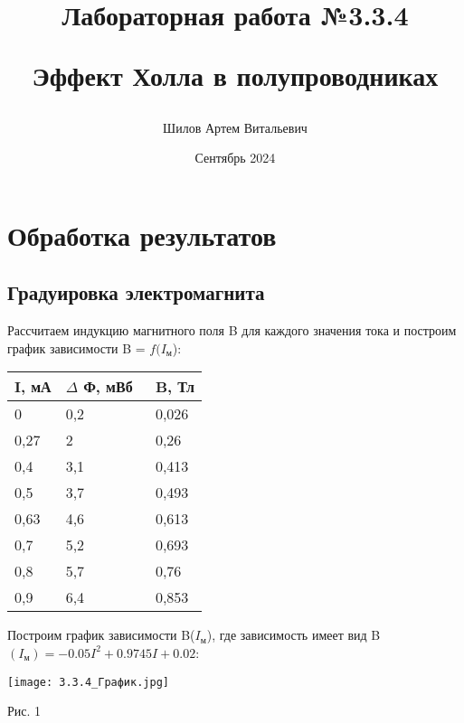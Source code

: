 \documentclass[a4paper, 12pt]{article}
\title{\begin{center}Лабораторная работа №3.3.4\end{center}
Эффект Холла в полупроводниках}
\author{Шилов Артем Витальевич\\}
\date{Сентябрь 2024}
\begin{document}
    \maketitle
    

\section{Обработка результатов}
\subsection{Градуировка электромагнита}
Рассчитаем индукцию магнитного поля B для каждого значения тока и построим график зависимости B = $f(I_\text{м}$):
\begin{center}
\begin{tabular}{|l|l|l|}
\hline
I, мА & $\Delta$ Ф, мВб\ & B, Тл \\ \hline
0     & 0,2                                     & 0,026                         \\ \hline
0,27  & 2                                       & 0,26                          \\ \hline
0,4   & 3,1                                     & 0,413                         \\ \hline
0,5   & 3,7                                     & 0,493                         \\ \hline
0,63  & 4,6                                     & 0,613                         \\ \hline
0,7   & 5,2                                     & 0,693                         \\ \hline
0,8   & 5,7                                     & 0,76                          \\ \hline
0,9   & 6,4                                     & 0,853                         \\ \hline
\end{tabular}
\end{center}
Построим график зависимости B($I_\text{м}$), где зависимость имеет вид B$(I_\text{м}) = -0.05I^2 + 0.9745I + 0.02 $:
\begin{center}
    \texttt{[image: 3.3.4\_График.jpg]}
    \caption{Рис. 1}
    \label{fig:enter-label}
\end{center}

\maketitle
\end{document}
